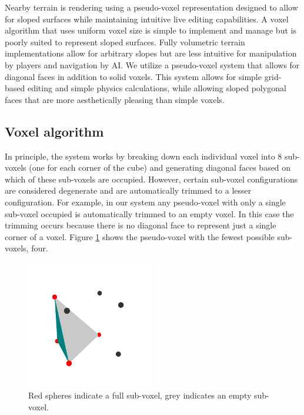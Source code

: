 Nearby terrain is rendering using a pseudo-voxel representation designed to allow for sloped surfaces while maintaining intuitive live editing capabilities.
A voxel algorithm that uses uniform voxel size is simple to implement and manage but is poorly suited to represent sloped surfaces.
Fully volumetric terrain implementations allow for arbitrary slopes but are less intuitive for manipulation by players and navigation by AI.
We utilize a pseudo-voxel system that allows for diagonal faces in addition to solid voxels.
This system allows for simple grid-based editing and simple physics calculations, while allowing sloped polygonal faces that are more aesthetically pleasing than simple voxels.

\subsection{Voxel algorithm}

In principle, the system works by breaking down each individual voxel into 8 sub-voxels (one for each corner of the cube) and generating diagonal faces based on which of these sub-voxels are occupied.
However, certain sub-voxel configurations are considered degenerate and are automatically trimmed to a lesser configuration.
For example, in our system any pseudo-voxel with only a single sub-voxel occupied is automatically trimmed to an empty voxel.
In this case the trimming occurs because there is no diagonal face to represent just a single corner of a voxel.
Figure \ref{fig:minimumvoxel} shows the pseudo-voxel with the fewest possible sub-voxels, four.

\begin{figure}
	\centering
		\includegraphics[width=0.5\textwidth]{figures/minimumvoxel.png}
	\caption{Red spheres indicate a full sub-voxel, grey indicates an empty sub-voxel.}
	\label{fig:minimumvoxel}
\end{figure}

